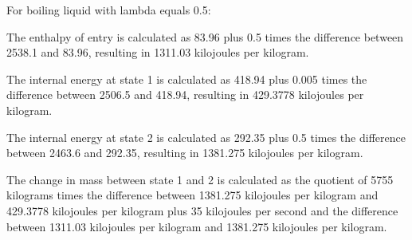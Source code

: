 For boiling liquid with lambda equals 0.5:

The enthalpy of entry is calculated as 83.96 plus 0.5 times the difference between 2538.1 and 83.96, resulting in 1311.03 kilojoules per kilogram.

The internal energy at state 1 is calculated as 418.94 plus 0.005 times the difference between 2506.5 and 418.94, resulting in 429.3778 kilojoules per kilogram.

The internal energy at state 2 is calculated as 292.35 plus 0.5 times the difference between 2463.6 and 292.35, resulting in 1381.275 kilojoules per kilogram.

The change in mass between state 1 and 2 is calculated as the quotient of 5755 kilograms times the difference between 1381.275 kilojoules per kilogram and 429.3778 kilojoules per kilogram plus 35 kilojoules per second and the difference between 1311.03 kilojoules per kilogram and 1381.275 kilojoules per kilogram.